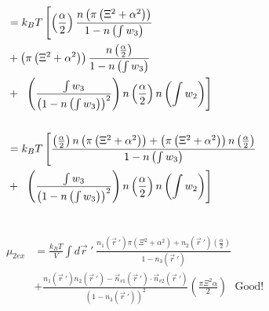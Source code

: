 \documentclass[double,12pt]{revtex4-2}
\begin{document}
\begin{align}          
            &= k_BT \left[\left(\frac{\alpha}{2}\right)\frac{n\left(\pi\left(\Xi^2+\alpha^2\right)\right)}{1-n\left(\int w_3\right)} \color{white}\right]\color{black} \\
            &+ \left(\pi\left(\Xi^2+\alpha^2\right)\right)\frac{n\left(\frac{\alpha}{2}\right)}{1-n\left(\int w_3\right)} \\
            &+ \color{white}\left[\color{black}\left(\frac{\int w_3}{\left(1-n\left(\int w_3\right)\right)^2}\right)n\left(\frac{\alpha}{2}\right)n\left(\int w_2\right)\right] \\ \\
%            
            &= k_BT \left[\frac{\left(\frac{\alpha}{2}\right)n\left(\pi\left(\Xi^2+\alpha^2\right)\right) + \left(\pi\left(\Xi^2+\alpha^2\right)\right)n\left(\frac{\alpha}{2}\right)}{1-n\left(\int w_3\right)} \color{white}\right]\color{black} \\
            &+ \color{white}\left[\color{black}\left(\frac{\int w_3}{\left(1-n\left(\int w_3\right)\right)^2}\right)n\left(\frac{\alpha}{2}\right)n\left(\int w_2\right)\right] \\ \\
\end{align}

\begin{align}
\mu_{2ex} &= \frac{k_BT}{V}\int d\vec r~'~ \frac{n_1(\vec r~')
           \pi(\Xi^2 + \alpha^2)
          +n_2(\vec r~')\left(\frac{\alpha}{2}\right)}{1-n_3(\vec r~')} 
          \nonumber \\
          &+ \frac{n_1(\vec r~')n_2(\vec r~')
          -\vec n_{v1}(\vec r~')
          \cdot \vec n_{v2}(\vec r~')}{(1-n_3(\vec r~'))^2}
          \left(\frac{\pi\Xi^2\alpha}{2}\right)  ~~~ \text{Good!}
\end{align}
\end{document}
